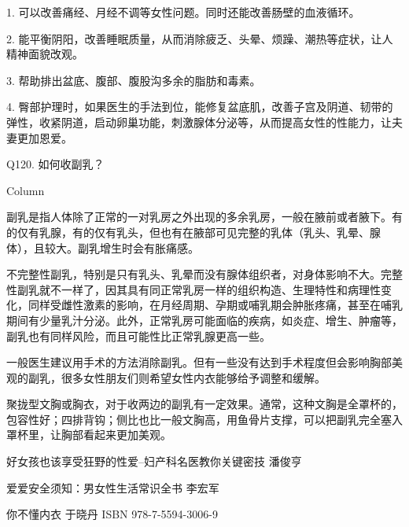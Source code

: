\documentclass[12pt,UTF8]{ctexbook}
\begin{document}
1. 可以改善痛经、月经不调等女性问题。同时还能改善肠壁的血液循环。

2. 能平衡阴阳，改善睡眠质量，从而消除疲乏、头晕、烦躁、潮热等症状，让人精神面貌改观。

3. 帮助排出盆底、腹部、腹股沟多余的脂肪和毒素。

4. 臀部护理时，如果医生的手法到位，能修复盆底肌，改善子宫及阴道、韧带的弹性，收紧阴道，启动卵巢功能，刺激腺体分泌等，从而提高女性的性能力，让夫妻更加恩爱。





Q120. 如何收副乳？



Column

副乳是指人体除了正常的一对乳房之外出现的多余乳房，一般在腋前或者腋下。有的仅有乳腺，有的仅有乳头，但也有在腋部可见完整的乳体（乳头、乳晕、腺体），且较大。副乳增生时会有胀痛感。

不完整性副乳，特别是只有乳头、乳晕而没有腺体组织者，对身体影响不大。完整性副乳就不一样了，因其具有同正常乳房一样的组织构造、生理特性和病理性变化，同样受雌性激素的影响，在月经周期、孕期或哺乳期会肿胀疼痛，甚至在哺乳期间有少量乳汁分泌。此外，正常乳房可能面临的疾病，如炎症、增生、肿瘤等，副乳也有同样风险，而且可能性比正常乳腺更高一些。


一般医生建议用手术的方法消除副乳。但有一些没有达到手术程度但会影响胸部美观的副乳，很多女性朋友们则希望女性内衣能够给予调整和缓解。

聚拢型文胸或胸衣，对于收两边的副乳有一定效果。通常，这种文胸是全罩杯的，包容性好；四排背钩；侧比也比一般文胸高，用鱼骨片支撑，可以把副乳完全塞入罩杯里，让胸部看起来更加美观。



\backmatter

好女孩也该享受狂野的性爱--妇产科名医教你关键密技  潘俊亨

爱爱安全须知：男女性生活常识全书				 李宏军

你不懂内衣									 于晓丹	ISBN 978-7-5594-3006-9
\end{document}
